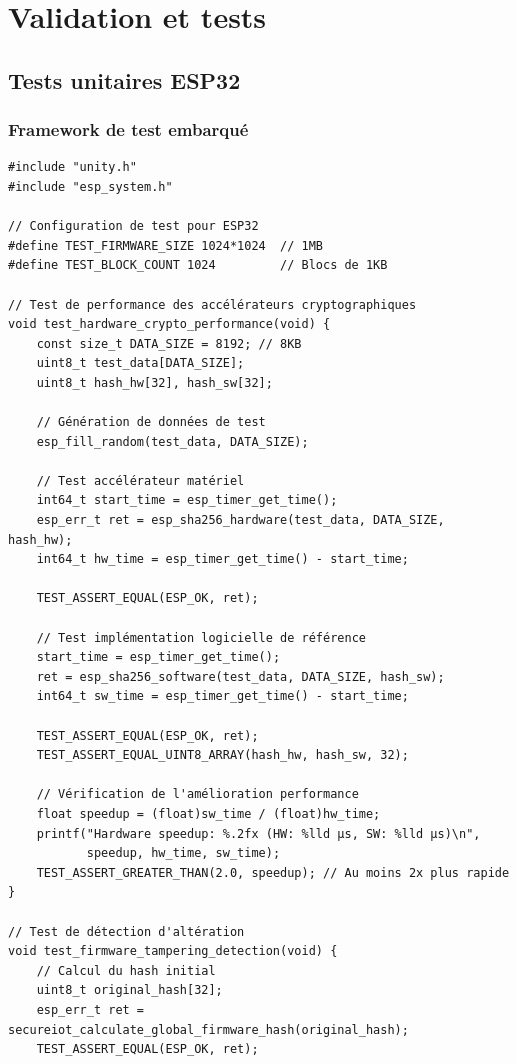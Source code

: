 \section{Validation et tests}

\subsection{Tests unitaires ESP32}

\subsubsection{Framework de test embarqué}

\begin{lstlisting}[caption={Framework de test embarqué pour ESP32}]
#include "unity.h"
#include "esp_system.h"

// Configuration de test pour ESP32
#define TEST_FIRMWARE_SIZE 1024*1024  // 1MB
#define TEST_BLOCK_COUNT 1024         // Blocs de 1KB

// Test de performance des accélérateurs cryptographiques
void test_hardware_crypto_performance(void) {
    const size_t DATA_SIZE = 8192; // 8KB
    uint8_t test_data[DATA_SIZE];
    uint8_t hash_hw[32], hash_sw[32];
    
    // Génération de données de test
    esp_fill_random(test_data, DATA_SIZE);
    
    // Test accélérateur matériel
    int64_t start_time = esp_timer_get_time();
    esp_err_t ret = esp_sha256_hardware(test_data, DATA_SIZE, hash_hw);
    int64_t hw_time = esp_timer_get_time() - start_time;
    
    TEST_ASSERT_EQUAL(ESP_OK, ret);
    
    // Test implémentation logicielle de référence
    start_time = esp_timer_get_time();
    ret = esp_sha256_software(test_data, DATA_SIZE, hash_sw);
    int64_t sw_time = esp_timer_get_time() - start_time;
    
    TEST_ASSERT_EQUAL(ESP_OK, ret);
    TEST_ASSERT_EQUAL_UINT8_ARRAY(hash_hw, hash_sw, 32);
    
    // Vérification de l'amélioration performance
    float speedup = (float)sw_time / (float)hw_time;
    printf("Hardware speedup: %.2fx (HW: %lld µs, SW: %lld µs)\n", 
           speedup, hw_time, sw_time);
    TEST_ASSERT_GREATER_THAN(2.0, speedup); // Au moins 2x plus rapide
}

// Test de détection d'altération
void test_firmware_tampering_detection(void) {
    // Calcul du hash initial
    uint8_t original_hash[32];
    esp_err_t ret = secureiot_calculate_global_firmware_hash(original_hash);
    TEST_ASSERT_EQUAL(ESP_OK, ret);
    

\end{lstlisting}
